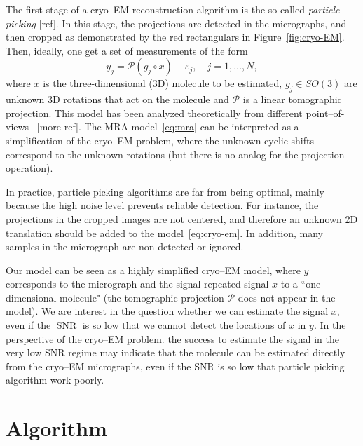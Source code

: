 \documentclass[journal]{IEEEtran}
\numberwithin{equation}{section}
\numberwithin{figure}{section}
\theoremstyle{plain}
\theoremstyle{definition}
\theoremstyle{remark}
\theoremstyle{plain}
\theoremstyle{remark}
\theoremstyle{plain}
\theoremstyle{plain}
\newcommand{\SNR}{\operatorname{SNR}}
\begin{document}
The first stage of a cryo--EM reconstruction algorithm is the so called \emph{particle picking} [ref]. In this stage, the projections are detected in the micrographs, and then cropped as demonstrated by the red rectangulars in Figure~\ref{fig:cryo-EM}.
Then, ideally, one get a set of measurements of the form 
\begin{equation} \label{eq:cryo-em}
y_j = \mathcal{P}( g_j\circ x) + \varepsilon_j,\quad j=1,\ldots,N, 
\end{equation}
where $x$ is the three-dimensional (3D) molecule to be estimated,  $g_j\in SO(3)$ are unknown 3D rotations that act on the molecule and $\mathcal{P}$ is a linear tomographic projection. This model has been analyzed theoretically from different point--of-views~\cite{bandeira2015non,hadani2011representation} [more ref]. The MRA model~\ref{eq:mra} can be interpreted as a simplification of the cryo--EM problem, where the unknown cyclic-shifts correspond to the unknown rotations (but there is no analog for the projection operation).

In practice, particle picking algorithms are far from being optimal, mainly because the high noise level prevents reliable detection. 
 For instance, the projections in the cropped images are not centered, and therefore an unknown 2D translation should be added to the model~\eqref{eq:cryo-em}.
 In addition, many samples in the micrograph are non detected or ignored. 
 
 Our model can be seen as a highly simplified cryo--EM model, where $y$ corresponds to the micrograph and the signal repeated signal $x$ to a  ``one-dimensional molecule" (the tomographic projection $\mathcal{P}$ does not appear in the model). We are interest in the question whether we can estimate the signal $x$, even if the $\SNR$ is so low that we cannot detect the locations of $x$ in $y$. In the perspective of the cryo--EM problem. the success to estimate the signal in the very low SNR regime may indicate that the molecule can be estimated directly from the cryo--EM micrographs, even if the SNR is so low that particle picking algorithm work poorly. 



   

\section{Algorithm} \label{sec:algorithm}
\end{document}

